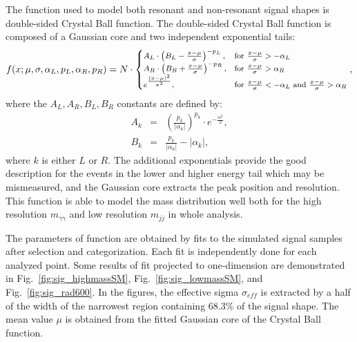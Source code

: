 The function used to model both resonant and non-resonant signal shapes is double-sided Crystal Ball function.
The double-sided Crystal Ball function is composed of a Gaussian core and two independent exponential tails:
\begin{equation}\label{eq:DoubleCB}\footnotesize
	f(x;\mu, \sigma, \alpha_{L}, p_{L}, \alpha_{R}, p_{R}) = N \cdot 
	\begin{cases} 
		A_{L} \cdot \left( B_{L} - \frac{x - \mu}{\sigma} \right)^{-p_{L}}, & \mbox{for } \frac{x - \mu}{\sigma} > - \alpha_{L} \\
		A_{R} \cdot \left( B_{R} + \frac{x - \mu}{\sigma} \right)^{-p_{R}}, & \mbox{for } \frac{x - \mu}{\sigma} > \alpha_{R} \\
		e^{  \frac{\left( x - \mu \right)^{2}}{\sigma^{2}} }, & \mbox{for } \frac{x - \mu}{\sigma} < - \alpha_{L}  \mbox{ and } \frac{x - \mu}{\sigma} > \alpha_{R}
	\end{cases},
\end{equation}
where the $A_{L}, A_{R}, B_{L}, B_{R}$ constants are defined by:
\begin{eqnarray}
	A_{k} &=& \left( \frac{p_{k}}{\left| \alpha_{k} \right|} \right)^{p_{k}} \cdot e^{-\frac{\alpha^{2}}{2}}, \\
	B_{k} &=& \frac{p_{k}}{\left| \alpha_{k} \right|} - \left| \alpha_{k} \right|,
\end{eqnarray}
where $k$ is either $L$ or $R$.
The additional exponentials provide the good description for the events in the lower and higher energy tail which may be mismeasured, and the Gaussian core extracts the peak position and resolution.
This function is able to model the mass distribution well both for the high resolution $m_{\gamma\gamma}$ and low resolution $m_{jj}$ in whole analysis.

The parameters of function are obtained by fits to the simulated signal samples after selection and categorization.
Each fit is independently done for each analyzed point.
Some results of fit projected to one-dimension are demonstrated in Fig.~\ref{fig:sig_highmassSM}, Fig.~\ref{fig:sig_lowmassSM}, and Fig.~\ref{fig:sig_rad600}.
In the figures, the effective sigma $\sigma_{eff}$ is extracted by a half of the width of the narrowest region containing 68.3\% of the signal shape.
The mean value $\mu$ is obtained from the fitted Gaussian core of the Crystal Ball function.

